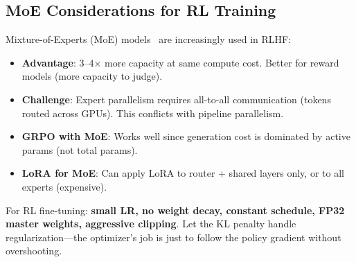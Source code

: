 \subsection{MoE Considerations for RL Training}
\label{moe-considerations-for-rl-training}

\begin{intuitionbox}
Mixture-of-Experts (MoE) models~\cite{fedus2022switch} are increasingly used in RLHF:

\begin{itemize}
  \item \textbf{Advantage}: 3--4$\times$ more capacity at same compute cost. Better for reward models (more capacity to judge).
  \item \textbf{Challenge}: Expert parallelism requires all-to-all communication (tokens routed across GPUs). This conflicts with pipeline parallelism.
  \item \textbf{GRPO with MoE}: Works well since generation cost is dominated by active params (not total params).
  \item \textbf{LoRA for MoE}: Can apply LoRA to router + shared layers only, or to all experts (expensive).
\end{itemize}
\end{intuitionbox}

\begin{intuitionbox}
For RL fine-tuning: \textbf{small LR, no weight decay, constant schedule, FP32 master weights, aggressive clipping}. Let the KL penalty handle regularization---the optimizer’s job is just to follow the policy gradient without overshooting.
\end{intuitionbox}


